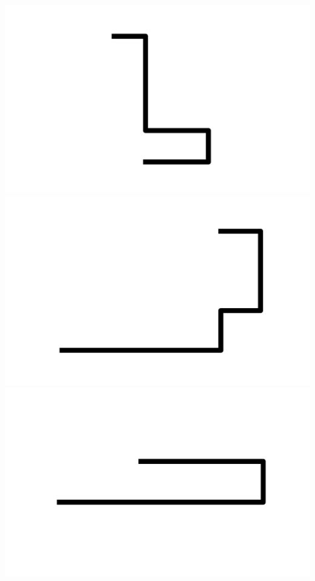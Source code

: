 \documentclass[]{report}
\begin{document}
\includegraphics[scale=.1]{pictures/21/state_cluster_shapes_376.pdf} 
\includegraphics[scale=.1]{pictures/21/state_cluster_shapes_377.pdf} 
\includegraphics[scale=.1]{pictures/21/state_cluster_shapes_378.pdf} 
\end{document}
